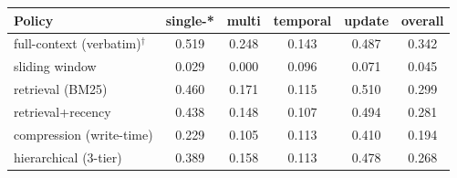 \begin{tabular}{lccccc}
\toprule
Policy & single-* & multi & temporal & update & overall \\
\midrule
full-context (verbatim)$^{\dagger}$ & 0.519 & 0.248 & 0.143 & 0.487 & 0.342\\
sliding window & 0.029 & 0.000 & 0.096 & 0.071 & 0.045\\
retrieval (BM25) & 0.460 & 0.171 & 0.115 & 0.510 & 0.299\\
retrieval+recency & 0.438 & 0.148 & 0.107 & 0.494 & 0.281\\
compression (write-time) & 0.229 & 0.105 & 0.113 & 0.410 & 0.194\\
hierarchical (3-tier) & 0.389 & 0.158 & 0.113 & 0.478 & 0.268\\
\bottomrule
\end{tabular}